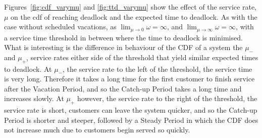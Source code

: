 \documentclass{article}
\begin{document}
Figures~\ref{fig:cdf_varymu} and \ref{fig:ttd_varymu} show the effect of the service rate, $\mu$ on the cdf of reaching deadlock and the expected time to deadlock.
As with the case without scheduled vacations, as $\lim_{\mu \to 0} \omega = \infty$, and $\lim_{\mu \to \infty} \omega = \infty$, with a service time threshold in between where the time to deadlock is minimised.
What is interesting is the difference in behaviour of the CDF of a system the $\mu_-$ and $\mu_+$, service rates either side of the threshold that yield similar expected times to deadlock.
At $\mu_-$, the service rate to the left of the threshold, the service time is very long.
Therefore it takes a long time for the first customer to finish service after the Vacation Period, and so the Catch-up Period takes a long time and increases slowly.
At $\mu_+$ however, the service rate to the right of the threshold, the service rate is short, customers can leave the system quicker, and so the Catch-up Period is shorter and steeper, followed by a Steady Period in which the CDF does not increase much due to customers begin served so quickly.
\end{document}
